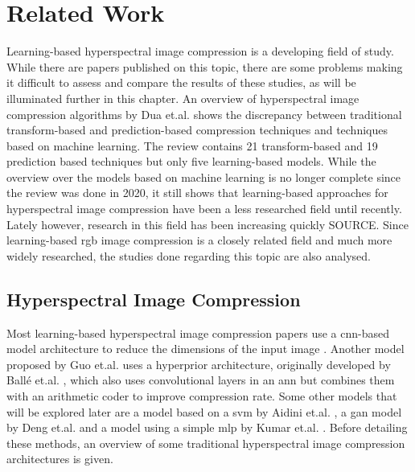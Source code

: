 \chapter{Related Work\label{cha:chapter2}}
Learning-based hyperspectral image compression is a developing field of study. While there are papers published on this topic, there are some problems making it difficult to assess and compare the results of these studies, as will be illuminated further in this chapter. An overview of hyperspectral image compression algorithms by Dua et.al. \citep{dua_comprehensive_2020} shows the discrepancy between traditional transform-based and prediction-based compression techniques and techniques based on machine learning. The review contains 21 transform-based and 19 prediction based techniques but only five learning-based models. While the overview over the models based on machine learning is no longer complete since the review was done in 2020, it still shows that learning-based approaches for hyperspectral image compression have been a less researched field until recently. Lately however, research in this field has been increasing quickly SOURCE.
Since learning-based \ac{rgb} image compression is a closely related field and much more widely researched, the studies done regarding this topic are also analysed.
\section{Hyperspectral Image Compression \label{sec:ch2hyperspectral}}
Most learning-based hyperspectral image compression papers use a \ac{cnn}-based model architecture to reduce the dimensions of the input image \citep{kuester_1d-convolutional_2021,kuester_transferability_2022,la_grassa_hyperspectral_2022}. Another model proposed by Guo et.al. \citep{guo_learned_2021} uses a hyperprior architecture, originally developed by Ballé et.al. \citep{balle_end--end_2017}, which also uses convolutional layers in an \ac{ann} but combines them with an arithmetic coder to improve compression rate.
Some other models that will be explored later are a model based on a \ac{svm} by Aidini et.al. \citep{aidini_hyperspectral_2019}, a \ac{gan} model by Deng et.al. \citep{deng_learning-based_2020} and a model using a simple \ac{mlp} by Kumar et.al. \citep{leal-taixe_onboard_2019}. Before detailing these methods, an overview of some traditional hyperspectral image compression architectures is given.
